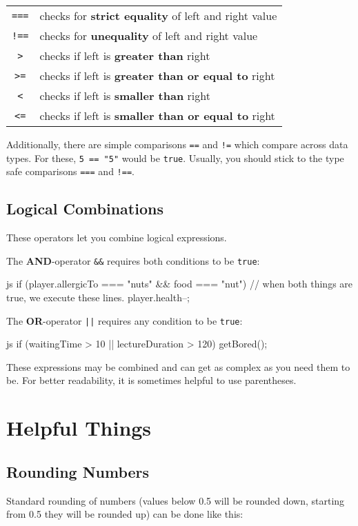 \documentclass[10pt,a4paper]{article}
\begin{document}
\begin{multicols}{3}
\vspace{0.5cm}
\begin{tabular}{c l}
  \texttt{===} & checks for \textbf{strict equality} of left and right value \\
  \texttt{!==} & checks for \textbf{unequality} of left and right value \\
  \texttt{>} & checks if left is \textbf{greater than} right \\
  \texttt{>=} & checks if left is \textbf{greater than or equal to} right \\
  \texttt{<} & checks if left is \textbf{smaller than} right \\
  \texttt{<=} & checks if left is \textbf{smaller than or equal to} right \\
\end{tabular}

Additionally, there are simple comparisons \texttt{==} and \texttt{!=} which compare across data types. For these, \texttt{5 == "5"} would be \texttt{true}. Usually, you should stick to the type safe comparisons \texttt{===} and \texttt{!==}.

\subsection*{Logical Combinations}
These operators let you combine logical expressions.

The \textbf{AND}-operator \texttt{\&\&} requires both conditions to be \texttt{true}:
\begin{codebox}{js}{}
  if (player.allergicTo === "nuts" && food === "nut") {
    // when both things are true, we execute these lines.
    player.health--;
  }
\end{codebox}

The \textbf{OR}-operator \texttt{||} requires any condition to be \texttt{true}:
\begin{codebox}{js}{}
  if (waitingTime > 10 || lectureDuration > 120) {
    getBored();
  }
\end{codebox}
These expressions may be combined and can get as complex as you need them to be. For better readability, it is sometimes helpful to use parentheses.

\section*{Helpful Things}
\subsection*{Rounding Numbers}
Standard rounding of numbers (values below 0.5 will be rounded down, starting from 0.5 they will be rounded up) can be done like this:


\end{multicols}
\end{document}
